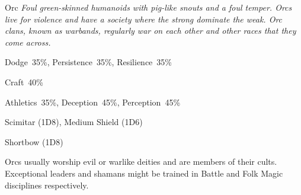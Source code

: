 \begin{monsterbox}{Orc}
	\textit{Foul green-skinned humanoids with pig-like snouts and a foul temper. Orcs live for violence and have a society where the strong dominate the weak. Orc clans, known as warbands, regularly war on each other and other races that they come across.}\\
	\rpghline
	\basics[%
        hitpoints  = 11, %
	majorwound = 6,
	damagemodifier = 0,
	powerpoints = 10,
	movementrate = 15m,
	armor = Leather (2AP),
	plunderrating = 2
	]
	\rpghline%
	\stats[ %
		STR = 4D6 (14),
		CON = 3D6 (11),
		DEX = 4D6 (14),
		SIZ = 2D6+3 (10),
		INT = 3D6   (11),
		POW = 2D6+3 (10),
		CHA = 2D6   (7)
	]
	\rpghline%
	\begin{rpg-monsteraction}[Resistances]
		Dodge~35\%, Persistence~35\%, Resilience~35\%
	\end{rpg-monsteraction}
	\begin{rpg-monsteraction}[Knowledge]
    		Craft~40\%
	\end{rpg-monsteraction}
	\begin{rpg-monsteraction}[Practical]
		Athletics~35\%, Deception~45\%, Perception~45\%
	\end{rpg-monsteraction}
	\begin{rpg-monsteraction}
		Scimitar (1D8), Medium Shield (1D6)
	\end{rpg-monsteraction}
	\begin{rpg-monsteraction}
		Shortbow (1D8)
	\end{rpg-monsteraction}
	\begin{rpg-monsteraction}[Supernatural]
		Orcs usually worship evil or warlike deities and are members of their cults. Exceptional leaders and shamans might be trained in Battle and Folk Magic disciplines respectively.
	\end{rpg-monsteraction}

\end{monsterbox}


